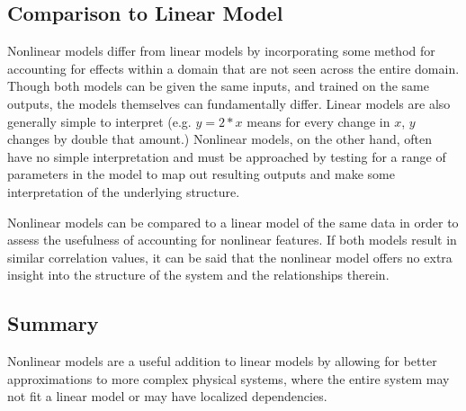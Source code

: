\subsection{Comparison to Linear Model}
Nonlinear models differ from linear models by incorporating some method for accounting for effects within a domain that are not seen across the entire domain. Though both models can be given the same inputs, and trained on the same outputs, the models themselves can fundamentally differ. Linear models are also generally simple to interpret (e.g. $y=2*x$ means for every change in $x$, $y$ changes by double that amount.) Nonlinear models, on the other hand, often have no simple interpretation and must be approached by testing for a range of parameters in the model to map out resulting outputs and make some interpretation of the underlying structure.

Nonlinear models can be compared to a linear model of the same data in order to assess the usefulness of accounting for nonlinear features. If both models result in similar correlation values, it can be said that the nonlinear model offers no extra insight into the structure of the system and the relationships therein. 

\subsection{Summary}
Nonlinear models are a useful addition to linear models by allowing for better approximations to more complex physical systems, where the entire system may not fit a linear model or may have localized dependencies. 



